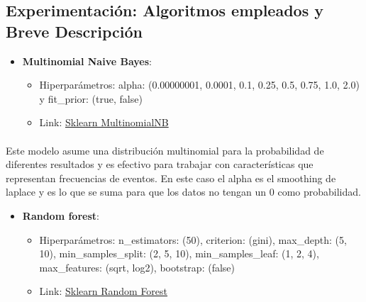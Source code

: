 \documentclass{report}
\begin{document}
            \subsection{Experimentación: Algoritmos empleados y Breve Descripción}
                \begin{itemize}
                    \item \textbf{Multinomial Naive Bayes}:
                    \begin{itemize}
                        \item Hiperparámetros: alpha: (0.00000001, 0.0001, 0.1, 0.25, 0.5, 0.75, 1.0, 2.0) y fit\_prior: (true, false)
                        \item Link: \href{https://scikit-learn.org/stable/modules/generated/sklearn.naive_bayes.MultinomialNB.html}{Sklearn MultinomialNB}
                    \end{itemize}
                \end{itemize}
                \paragraph*{}{
                Este modelo asume una distribución multinomial para la probabilidad de diferentes resultados y es efectivo para trabajar con características que representan frecuencias de eventos. En este caso el alpha es el smoothing de laplace y es lo que se suma para que los datos no tengan un 0 como probabilidad.
                }
                \begin{itemize}
                    \item \textbf{Random forest}:
                    \begin{itemize}
                         \item {Hiperparámetros: n\_estimators: (50), criterion: (gini), max\_depth: (5, 10), min\_samples\_split: (2, 5, 10), min\_samples\_leaf: (1, 2, 4), max\_features: (sqrt, log2), bootstrap: (false) }
                        \item Link: \href{https://scikit-learn.org/stable/modules/generated/sklearn.ensemble.RandomForestClassifier.html}{Sklearn Random Forest}
                    \end{itemize}
                \end{itemize}
\end{document}
